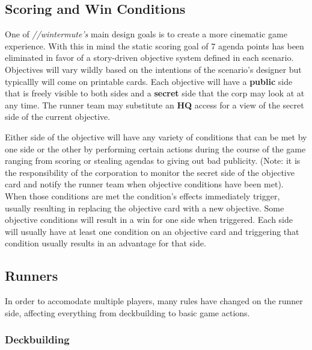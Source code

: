 \documentclass[titlepage]{article}
\begin{document}
\subsection{Scoring and Win Conditions}

One of \emph{//wintermute's} main design goals is to create a more cinematic game experience. With this in mind the static scoring goal of 7 agenda points has been eliminated in favor of a story-driven objective system defined in each scenario. Objectives will vary wildly based on the intentions of the scenario's designer but typicallly will come on printable cards. Each objective will have a \textbf{public} side that is freely visible to both sides and a \textbf{secret} side that the corp may look at at any time. The runner team may substitute an \textbf{HQ} access for a view of the secret side of the current objective.

Either side of the objective will have any variety of conditions that can be met by one side or the other by performing certain actions during the course of the game ranging from scoring or stealing agendas to giving out bad publicity. (Note: it is the responsibility of the corporation to monitor the secret side of the objective card and notify the runner team when objective conditions have been met). When those conditions are met the condition's effects immediately trigger, usually resulting in replacing the objective card with a new objective. Some objective conditions will result in a win for one side when triggered. Each side will usually have at least one condition on an objective card and triggering that condition usually results in an advantage for that side. 

\subsection{Runners}

In order to accomodate multiple players, many rules have changed on the runner side, affecting everything from deckbuilding to basic game actions.

\subsubsection{Deckbuilding}
\end{document}
